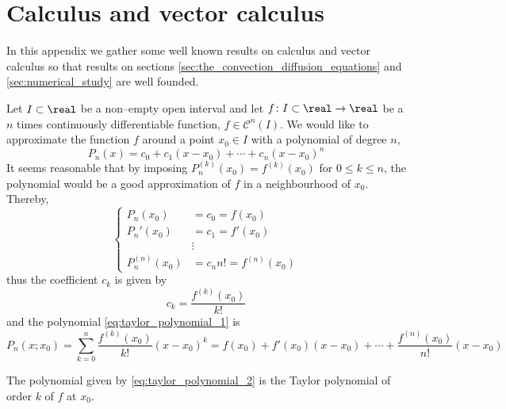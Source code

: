 
\section{Calculus and vector calculus}

In this appendix we gather some well known results on calculus and vector
calculus so that results on sections
\ref{sec:the_convection_diffusion_equations} and \ref{sec:numerical_study} are
well founded.

Let $I \subset \real$ be a non--empty open interval and let $f \colon I \subset
\real \to \real$ be a $n$ times continuously differentiable function, \ie $f \in
\mathcal{C}^n(I)$. We would like to approximate the function $f$ around a point
$x_0 \in I$ with a polynomial of degree $n$,
\begin{equation} \label{eq:taylor_polynomial_1}
    P_n(x) = c_0 + c_1 (x - x_0) + \cdots + c_n (x - x_0)^n
\end{equation}
It seems reasonable that by imposing $P_n^{(k)}(x_0) = f^{(k)}(x_0)$ for $0 \leq
k \leq n$, the polynomial would be a good approximation of $f$ in a
neighbourhood of $x_0$. Thereby,
\begin{equation}
    \left\{
        \begin{aligned}
            P_n(x_0) &= c_0 = f(x_0) \\
            P_n'(x_0) &= c_1 = f'(x_0) \\
            &\vdots \\
            P_n^{(n)}(x_0) &= c_n n! = f^{(n)}(x_0)
         \end{aligned}
    \right.
\end{equation}
thus the coefficient $c_k$ is given by
\begin{equation}
    c_k = \frac{f^{(k)}(x_0)}{k!}
\end{equation}
and the polynomial \eqref{eq:taylor_polynomial_1} is
\begin{equation} \label{eq:taylor_polynomial_2}
    P_n(x;x_0) = 
    \sum_{k=0}^n \frac{f^{(k)}(x_0)}{k!} (x - x_0)^k = 
    f(x_0) + f'(x_0) (x - x_0) + \cdots + \frac{f^{(n)}(x_0)}{n!} (x - x_0)
\end{equation}

\begin{definition*}
    The polynomial given by \eqref{eq:taylor_polynomial_2} is the Taylor
    polynomial of order $k$ of $f$ at $x_0$.
\end{definition*}

\begin{theorem}
	
\end{theorem}

\begin{theorem}
	
\end{theorem}